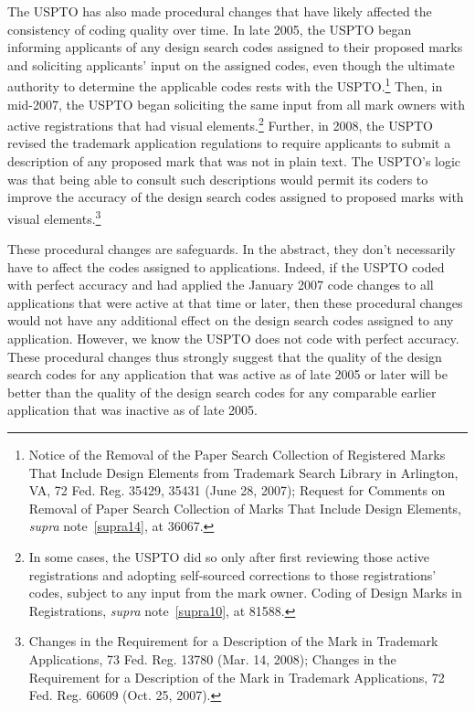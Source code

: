 \documentclass[letterpaper, 11pt, oneside]{article}
\begin{document}
\begin{enumerate}
The USPTO has also made procedural changes that have likely affected the consistency of coding quality over time. In late 2005, the USPTO began informing applicants of any design search codes assigned to their proposed marks and soliciting applicants' input on the assigned codes, even though the ultimate authority to determine the applicable codes rests with the USPTO.\footnote{\label{supra27} Notice of the Removal of the Paper Search Collection of Registered Marks That Include Design Elements from Trademark Search Library in Arlington, VA, 72 Fed. Reg. 35429, 35431 (June 28, 2007); Request for Comments on Removal of Paper Search Collection of Marks That Include Design Elements, \textit{supra} note~\ref{supra14}, at 36067.} Then, in mid-2007, the USPTO began soliciting the same input from all mark owners with active registrations that had visual elements.\footnote{In some cases, the USPTO did so only after first reviewing those active registrations and adopting self-sourced corrections to those registrations' codes, subject to any input from the mark owner. Coding of Design Marks in Registrations, \textit{supra} note~\ref{supra10}, at 81588.} Further, in 2008, the USPTO revised the trademark application regulations to require applicants to submit a description of any proposed mark that was not in plain text. The USPTO's logic was that being able to consult such descriptions would permit its coders to improve the accuracy of the design search codes assigned to proposed marks with visual elements.\footnote{Changes in the Requirement for a Description of the Mark in Trademark Applications, 73 Fed. Reg. 13780 (Mar. 14, 2008); Changes in the Requirement for a Description of the Mark in Trademark Applications, 72 Fed. Reg. 60609 (Oct. 25, 2007).}

These procedural changes are safeguards. In the abstract, they don't necessarily have to affect the codes assigned to applications. Indeed, if the USPTO coded with perfect accuracy and had applied the January 2007 code changes to all applications that were active at that time or later, then these procedural changes would not have any additional effect on the design search codes assigned to any application. However, we know the USPTO does not code with perfect accuracy. These procedural changes thus strongly suggest that the quality of the design search codes for any application that was active as of late 2005 or later will be better than the quality of the design search codes for any comparable earlier application that was inactive as of late 2005.


\end{enumerate}
\end{document}

